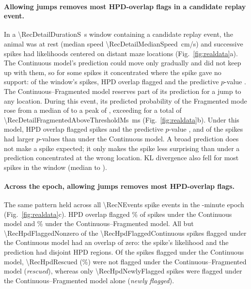 \documentclass[12pt]{article}
\begin{document}
\paragraph{Allowing jumps removes most HPD-overlap flags in a candidate replay event.} In a \SI{\RecDetailDurationS}{s} window containing a candidate replay event, the animal was at rest (median speed \SI{\RecDetailMedianSpeed}{cm/s}) and successive spikes had likelihoods centered on distant maze locations (Fig.~\ref{fig:realdata}a). The Continuous model's prediction could move only gradually and did not keep up with them, so for some spikes it concentrated where the spike gave no support: of the window's \RecDetailNEvents{} spikes, HPD overlap flagged \RecDetailHpdFlaggedContinuous{} and the predictive $p$-value \RecDetailPvalueFlaggedContinuous. The Continuous--Fragmented model reserves part of its prediction for a jump to any location. During this event, its predicted probability of the Fragmented mode rose from a median of \RecDetailFragmentedShareMedian{} to a peak of \RecDetailFragmentedSharePeak, exceeding \RecFragmentedThreshold{} for a total of \SI{\RecDetailFragmentedAboveThresholdMs}{ms} (Fig.~\ref{fig:realdata}b). Under this model, HPD overlap flagged \RecDetailHpdFlaggedFragmented{} spikes and the predictive $p$-value \RecDetailPvalueFlaggedFragmented, and \RecDetailPvalueHigher{} of the \RecDetailNEvents{} spikes had larger $p$-values than under the Continuous model. A broad prediction does not make a spike expected; it only makes the spike less surprising than under a prediction concentrated at the wrong location. KL divergence also fell for most spikes in the window (median \RecDetailKlMedianContinuous{} to \RecDetailKlMedianFragmented).

\paragraph{Across the epoch, allowing jumps removes most HPD-overlap flags.} The same pattern held across all \num{\RecNEvents} spike events in the \RecEpochDurationMin-minute epoch (Fig.~\ref{fig:realdata}c). HPD overlap flagged \RecHpdFlagRateContinuous\% of spikes under the Continuous model and \RecHpdFlagRateFragmented\% under the Continuous--Fragmented model. All but \num{\RecHpdFlaggedNonzero} of the \num{\RecHpdFlaggedContinuous} spikes flagged under the Continuous model had an overlap of zero: the spike's likelihood and the prediction had disjoint HPD regions. Of the spikes flagged under the Continuous model, \num{\RecHpdRescued} (\RecHpdRescuedPercent\%) were not flagged under the Continuous--Fragmented model (\emph{rescued}), whereas only \num{\RecHpdNewlyFlagged} spikes were flagged under the Continuous--Fragmented model alone (\emph{newly flagged}).
\end{document}
